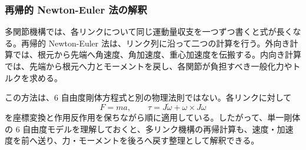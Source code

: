 \subsubsection{再帰的 Newton-Euler 法の解釈}

多関節機構では、各リンクについて同じ運動量収支を一つずつ書くと式が長くなる。再帰的 Newton-Euler 法は、リンク列に沿って二つの計算を行う。外向き計算では、根元から先端へ角速度、角加速度、重心加速度を伝搬する。内向き計算では、先端から根元へ力とモーメントを戻し、各関節が負担すべき一般化力やトルクを求める。

この方法は、6 自由度剛体方程式と別の物理法則ではない。各リンクに対して
\begin{equation}
  F=m a,\qquad
  \tau=J\dot{\omega}+\omega\times J\omega
\end{equation}
を座標変換と作用反作用を保ちながら順に適用している。したがって、単一剛体の 6 自由度モデルを理解しておくと、多リンク機構の再帰計算も、速度・加速度を前へ送り、力・モーメントを後ろへ戻す整理として解釈できる。

